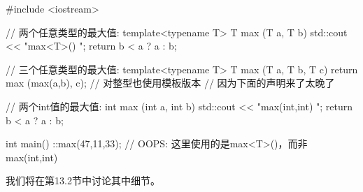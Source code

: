 \begin{cpp}
#include <iostream>

// 两个任意类型的最大值:
template<typename T>
T max (T a, T b)
{
	std::cout << "max<T>() \n";
	return b < a ? a : b;
}

// 三个任意类型的最大值:
template<typename T>
T max (T a, T b, T c)
{
	return max (max(a,b), c); // 对整型也使用模板版本
}                             // 因为下面的声明来了太晚了
                              
// 两个int值的最大值:
int max (int a, int b)
{
	std::cout << "max(int,int) \n";
	return b < a ? a : b;
}

int main()
{
	::max(47,11,33); // OOPS: 这里使用的是max<T>()，而非max(int,int)
}
\end{cpp}

我们将在第13.2节中讨论其中细节。


